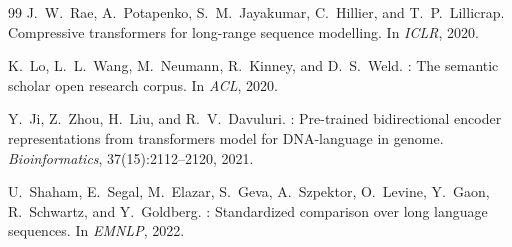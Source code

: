 \documentclass[10pt,twocolumn]{article}
\theoremstyle{plain}
\theoremstyle{definition}
\theoremstyle{remark}
\begin{document}
\begin{thebibliography}{99}
J.~W.~Rae, A.~Potapenko, S.~M.~Jayakumar, C.~Hillier, and T.~P.~Lillicrap.
\newblock Compressive transformers for long-range sequence modelling.
\newblock In \textit{ICLR}, 2020.

K.~Lo, L.~L.~Wang, M.~Neumann, R.~Kinney, and D.~S.~Weld.
: The semantic scholar open research corpus.
\newblock In \textit{ACL}, 2020.

Y.~Ji, Z.~Zhou, H.~Liu, and R.~V.~Davuluri.
: Pre-trained bidirectional encoder representations from
transformers model for {DNA}-language in genome.
\newblock \textit{Bioinformatics}, 37(15):2112--2120, 2021.

U.~Shaham, E.~Segal, M.~Elazar, S.~Geva, A.~Szpektor, O.~Levine,
Y.~Gaon, R.~Schwartz, and Y.~Goldberg.
: Standardized comparison over long language sequences.
\newblock In \textit{EMNLP}, 2022.

\end{thebibliography}
\endgroup
\end{document}
